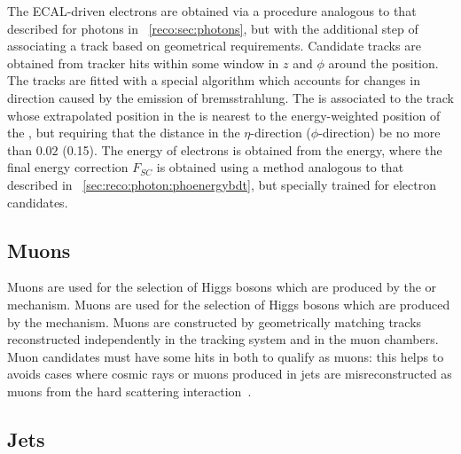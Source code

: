 The ECAL-driven electrons are obtained via a procedure analogous to that described for photons in \Sec~\ref{reco:sec:photons}, but with the additional step of associating a track based on geometrical requirements. Candidate tracks are obtained from tracker hits within some window in $z$ and $\phi$ around the \SC position. The tracks are fitted with a special algorithm which accounts for changes in direction caused by the emission of bremsstrahlung. The \SC is associated to the track whose extrapolated position in the \ECAL is nearest to the energy-weighted position of the \SC, but requiring that the distance in the $\eta$-direction ($\phi$-direction) be no more than $0.02$ (0.15). The energy of electrons is obtained from the \SC energy, where the final energy correction $F_{SC}$ is obtained using a \BDT method analogous to that described in \Sec~\ref{sec:reco:photon:phoenergybdt}, but specially trained for electron candidates.

\subsection{Muons}

\ifNewAnalysis
Muons are used for the selection of Higgs bosons which are produced by the \ZH or \WH mechanism. 
\else
Muons are used for the selection of Higgs bosons which are produced by the \ttH mechanism. 
\fi
Muons are constructed by geometrically matching tracks reconstructed independently in the tracking system and in the muon chambers. Muon candidates must have some hits in both \subdetector\s to qualify as \PF muons: this helps to avoids cases where cosmic rays or muons produced in jets are misreconstructed as muons from the hard scattering interaction~\cite{MuonReco}.

\subsection{Jets}
\label{reco:sec:jets}

